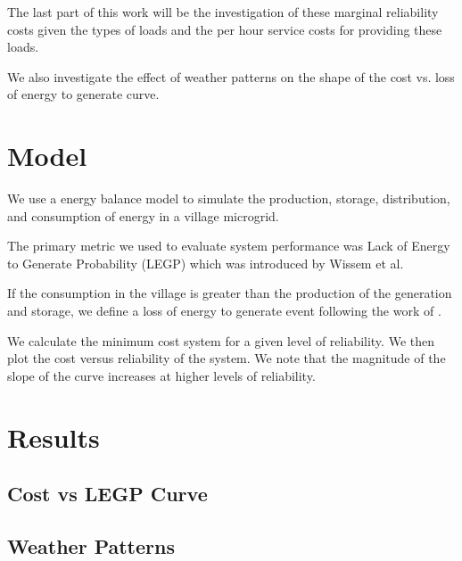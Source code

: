 \documentclass{article}
\begin{document}
The last part of this work will be the investigation of these marginal
reliability costs given the types of loads and the per hour service
costs for providing these loads.

We also investigate the effect of weather patterns on the shape of the
cost vs. loss of energy to generate curve.


\section{Model}
We use a energy balance model to simulate the production, storage,
distribution, and consumption of energy in a village microgrid.

The primary metric we used to evaluate system performance was Lack of Energy to Generate Probability (LEGP) which was introduced by Wissem et al. 

If the consumption in the village is greater than the production of the
generation and storage, we define a loss of energy to generate event
following the work of \cite{}.

We calculate the minimum cost system for a given level of reliability.
We then plot the cost versus reliability of the system.
We note that the magnitude of the slope of the curve increases at higher
levels of reliability.


\section{Results}
\subsection{Cost vs LEGP Curve}
\subsection{Weather Patterns}
\end{document}
